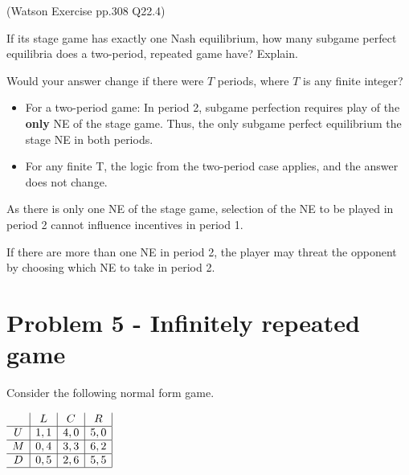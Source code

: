 \documentclass{article}
\begin{document}
(Watson Exercise pp.308 Q22.4)

If its stage game has exactly one Nash equilibrium, how many subgame
perfect equilibria does a two-period, repeated game have? Explain. 

\smallskip

Would your answer change if there were $T$ periods, where $T$ is any finite integer?

\bigskip


\begin{itemize}
\item For a two-period game: In period 2, subgame perfection requires play of the \textbf{only} NE
of the stage game. Thus, the only subgame perfect equilibrium the stage NE in both periods. 

\item For any finite T, the logic from the two-period case applies, and the answer does not
change.

\end{itemize}

\begin{mdframed}[backgroundcolor=blue!20,linecolor=white]
As there is only one NE of the stage game,
selection of the NE to be played in period 2 cannot influence
incentives in period 1.

\medskip 

If there are more than one NE in period 2, 
the player may threat the opponent by choosing which NE to take in period 2.

\end{mdframed}



\section{Problem 5 - Infinitely repeated game}

Consider the following normal form game.

\begin{center}
$
\begin{array}{c|c|c|c|}
& L & C & R \\
\hline
U & 1,1 & 4,0 & 5,0 \\
\hline
M & 0,4 & 3,3 & 6,2 \\
\hline
D & 0,5 & 2,6 & 5,5 \\
\hline\end{array}
$
\end{center}
\end{document}
